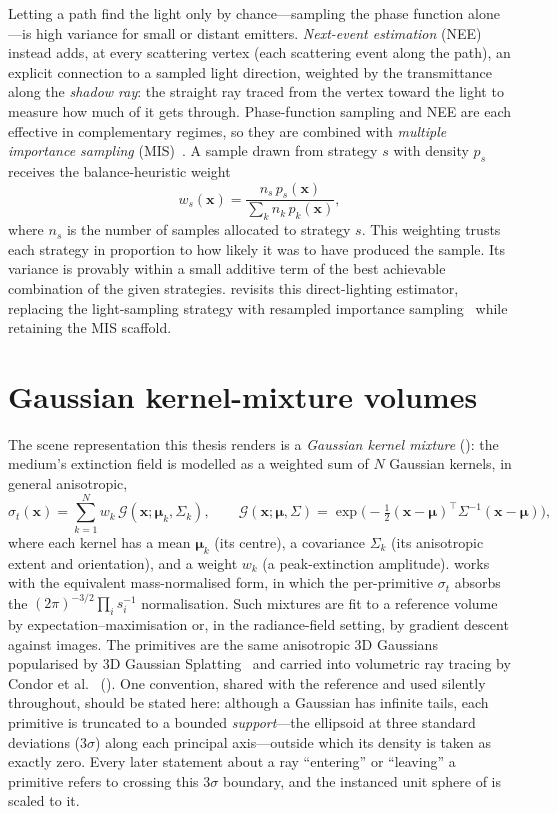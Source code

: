 Letting a path find the light only by chance---sampling the phase function alone---is high variance
for small or distant emitters. \emph{Next-event estimation} (NEE) instead adds, at every scattering vertex (each
scattering event along the path), an explicit connection to a sampled light direction,
weighted by the transmittance along the \emph{shadow ray}: the straight ray traced from
the vertex toward the light to measure how much of it gets through. Phase-function sampling and NEE are each effective in complementary regimes, so they are
combined with \emph{multiple importance sampling} (MIS)~\cite{VeachGuibas1995}. A sample drawn from
strategy $s$ with density $p_s$ receives the balance-heuristic weight
\[
  w_s(\bm{x}) = \frac{n_s\,p_s(\bm{x})}{\sum_k n_k\,p_k(\bm{x})},
\]
where $n_s$ is the number of samples allocated to strategy $s$. This weighting trusts each strategy in
proportion to how likely it was to have produced the sample. Its variance is provably within a
small additive term of the best achievable combination of the given strategies.
 revisits this direct-lighting estimator, replacing the light-sampling
strategy with resampled importance sampling~\cite{Talbot2005} while retaining the MIS scaffold.

\section{Gaussian kernel-mixture volumes}
\label{sec:kernel-mixture}

The scene representation this thesis renders is a \emph{Gaussian kernel mixture}
(): the medium's
extinction field is modelled as a weighted sum of $N$ Gaussian kernels, in general anisotropic,
\[
  \sigma_t(\bm{x}) = \sum_{k=1}^{N} w_k\,
  \mathcal{G}(\bm{x};\bm{\mu}_k,\Sigma_k),
  \qquad
  \mathcal{G}(\bm{x};\bm{\mu},\Sigma) =
  \exp\!\Big(-\tfrac{1}{2}(\bm{x}-\bm{\mu})^{\!\top}\Sigma^{-1}(\bm{x}-\bm{\mu})\Big),
\]
where each kernel has a mean $\bm{\mu}_k$ (its centre), a covariance $\Sigma_k$ (its anisotropic
extent and orientation), and a weight $w_k$ (a peak-extinction amplitude).  works
with the equivalent mass-normalised form, in which the per-primitive $\sigma_t$ absorbs the
$(2\pi)^{-3/2}\prod_i s_i^{-1}$ normalisation. Such mixtures are fit to a reference
volume by expectation--maximisation or, in the radiance-field setting, by gradient descent against
images. The primitives are the same anisotropic 3D Gaussians popularised by 3D Gaussian
Splatting~\cite{3DGS} and carried into volumetric ray tracing by Condor et
al.~\cite{DSYG} (). One convention, shared with the reference and
used silently throughout, should be stated here: although a Gaussian has infinite tails,
each primitive is truncated to a bounded \emph{support}---the ellipsoid at three standard
deviations ($3\sigma$) along each principal axis---outside which its density is taken as
exactly zero. Every later statement about a ray ``entering'' or ``leaving'' a primitive
refers to crossing this $3\sigma$ boundary, and the instanced unit sphere of
 is scaled to it.

